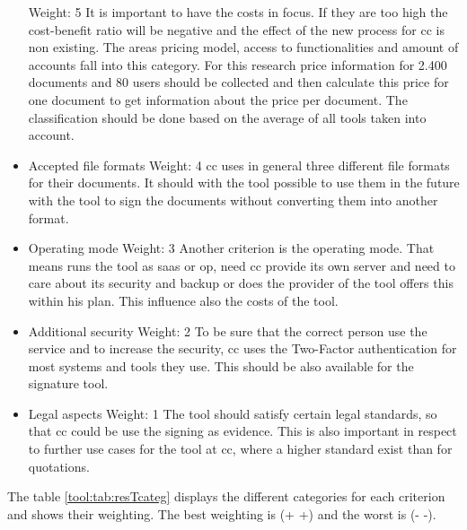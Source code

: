 \begin{itemize}
	Weight: 5 \newline
	It is important to have the costs in focus. If they are too high the cost-benefit ratio will be negative and the effect of the new process for \gls{cc} is non existing. The areas pricing model, access to functionalities and amount of accounts fall into this category. For this research price information for 2.400 documents and 80 users should be collected and then calculate this price for one document to get information about the price per document. The classification should be done based on the average of all tools taken into account.
	\item Accepted file formats \newline
	Weight: 4 \newline
	\Gls{cc} uses in general three different file formats for their documents. It should with the tool possible to use them in the future with the tool to sign the documents without converting them into another format.
	\item Operating mode \newline
	Weight: 3 \newline
	Another criterion is the operating mode. That means runs the tool as \gls{saas} or \gls{op}, need \gls{cc} provide its own server and need to care about its security and backup or does the provider of the tool offers this within his plan. This influence also the costs of the tool.
	\item Additional security \newline
	Weight: 2 \newline
	To be sure that the correct person use the service and to increase the security, \gls{cc} uses the Two-Factor authentication for most systems and tools they use. This should be also available for the signature tool.
	\item Legal aspects \newline
	Weight: 1 \newline
	The tool should satisfy certain legal standards, so that \gls{cc} could be use the signing as evidence. This is also important in respect to further use cases for the tool at \gls{cc}, where a higher standard exist than for quotations.
\end{itemize}

The table \ref{tool:tab:resTcateg} displays the different categories for each criterion and shows
their weighting. The best weighting is (+ +) and the worst is (- -). 

